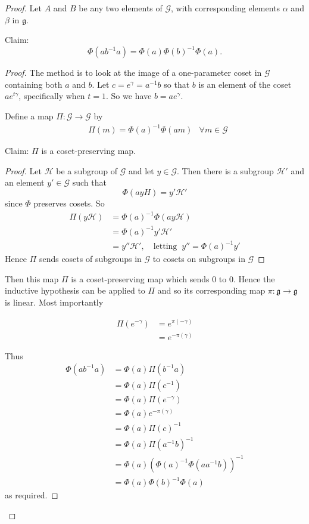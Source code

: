 \documentclass[honours]{UNSWthesis}
\newcommand{\G}{\mathcal{G}}
\newcommand{\g}{\mathfrak{g}}
\newcommand{\1}{\mathbf{e}_{1}}
\newcommand{\2}{\mathbf{e}_{3}}
\newcommand{\3}{\mathbf{e}_{3}}
\begin{document}
\begin{proof}
Let $A$ and $B$ be any two elements of $\G$, with corresponding elements $\alpha$ and $\beta$ in $\g$. 

Claim: 
\[
\Phi(ab^{-1}a)=\Phi(a)\Phi(b)^{-1}\Phi(a).
\]
\begin{proof}

The method is to look at the image of a one-parameter coset in $\G$ containing both $a$ and $b$. 
Let $c=e^{\gamma}=a^{-1}b$ so that $b$ is an element of the coset $ae^{t\gamma}$, specifically when $t=1$. 
So we have $b=ae^{\gamma}$.

Define a map $ \Pi:\G \longrightarrow \G $ by 
\begin{align*}
&\Pi(m)=\Phi(a)^{-1}\Phi(am) & \forall m \in \G
\end{align*}

Claim: $\Pi$ is a coset-preserving map.

\begin{proof}
Let $\mathcal{H}$ be a subgroup of $\G$ and let $y \in \G$. Then there is a subgroup $\mathcal{H}'$ and an element $y' \in \G$ such that 
\[
\Phi(ayH) = y'\mathcal{H}'
\]
since $\Phi$ preserves cosets. 
So 
\begin{align*}
\Pi(y\mathcal{H}) &= \Phi(a)^{-1} \Phi(ay\mathcal{H}) \\
&= \Phi(a)^{-1}y'\mathcal{H}' \\
&= y''\mathcal{H}',\quad \text{letting}\;\; y''=\Phi(a)^{-1}y'
\end{align*}
Hence $\Pi$ sends cosets of subgroups in $\G$ to cosets on subgroups in $\G$ 
\end{proof}

Then this map $\Pi$ is a coset-preserving map which sends $0$ to $0$. Hence the inductive hypothesis can be applied to $\Pi$ and so its corresponding map $\pi: \g \longrightarrow \g$ is linear.
Most importantly 

\begin{align*}
\Pi(e^{-\gamma}) &= e^{\pi(-\gamma)} \\
&= e^{-\pi(\gamma)}
\end{align*}

Thus 
\begin{align*}
\Phi(ab^{-1}a) &= \Phi(a)\Pi(b^{-1}a)\\
&= \Phi(a)\Pi(c^{-1})\\
&= \Phi(a) \Pi(e^{-\gamma}) \\
&= \Phi(a) e^{-\pi(\gamma)} \\
&= \Phi(a) \Pi(c)^{-1} \\
&= \Phi(a) \Pi(a^{-1}b)^{-1} \\
&= \Phi(a) (\Phi(a)^{-1}\Phi(aa^{-1}b))^{-1} \\
&= \Phi(a) \Phi(b)^{-1} \Phi(a)
\end{align*}
as required. 


\end{proof}
\end{proof}
\end{document}

